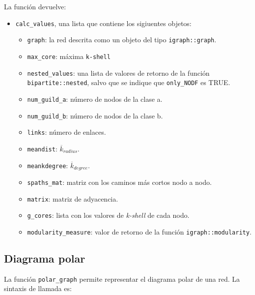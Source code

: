 La función devuelve:
\begin{itemize}
\item \texttt{calc\_values}, una lista que contiene los sigiuentes objetos:
   \begin{itemize}
   
\item \texttt{graph}: la red descrita como un objeto del tipo \texttt{igraph::graph}.

\item \texttt{max\_core}: máxima \texttt{k-shell}

\item \texttt{nested\_values}: una lista de valores de retorno de la función \texttt{bipartite::nested}, salvo que se indique que \texttt{only\_NODF} es TRUE.

\item \texttt{num\_guild\_a}: número de nodos de la clase a.

\item \texttt{num\_guild\_b}: número de nodos de la clase b.

\item \texttt{links}: número de enlaces.

\item \texttt{meandist}: $\overline {k}_{radius}$.

\item \texttt{meankdegree}:  $\overline {k}_{degree}$.

\item \texttt{spaths\_mat}: matriz con los caminos más cortos nodo a nodo.

\item \texttt{matrix}: matriz de adyacencia.

\item \texttt{g\_cores}: lista con los valores de \textit{k-shell} de cada nodo.

\item \texttt{modularity\_measure}: valor de retorno de la función \texttt{igraph::modularity}.
   \end{itemize}


\end{itemize}

\subsection*{Diagrama polar}
\label{polar_plot}

La función \texttt{polar\_graph} permite representar el diagrama polar de una red. La sintaxis de llamada es:


